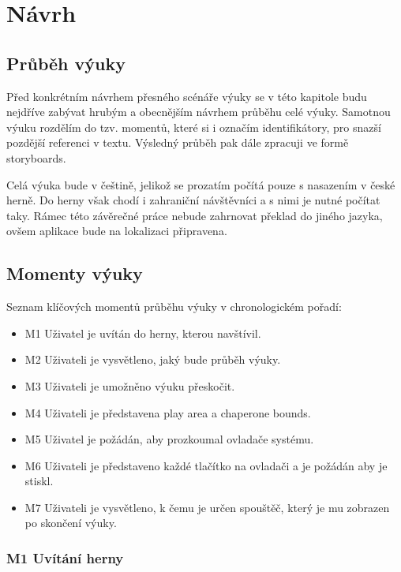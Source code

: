 \section{Návrh}\label{nuxe1vrh}

\subsection{Průběh výuky}\label{prux16fbux11bh-vuxfduky}

Před konkrétním návrhem přesného scénáře výuky se v této kapitole budu
nejdříve zabývat hrubým a obecnějším návrhem průběhu celé výuky.
Samotnou výuku rozdělím do tzv. momentů, které si i označím
identifikátory, pro snazší pozdější referenci v textu. Výsledný průběh
pak dále zpracuji ve formě storyboards.

Celá výuka bude v češtině, jelikož se prozatím počítá pouze s nasazením
v české herně. Do herny však chodí i zahraniční návštěvníci a s nimi je
nutné počítat taky. Rámec této závěrečné práce nebude zahrnovat překlad
do jiného jazyka, ovšem aplikace bude na lokalizaci připravena.

\subsection{Momenty výuky}\label{momenty-vuxfduky}

Seznam klíčových momentů průběhu výuky v chronologickém pořadí:

\begin{itemize}
\tightlist
\item
  M1 Uživatel je uvítán do herny, kterou navštívil.
\item
  M2 Uživateli je vysvětleno, jaký bude průběh výuky.
\item
  M3 Uživateli je umožněno výuku přeskočit.
\item
  M4 Uživateli je představena play area a chaperone bounds.
\item
  M5 Uživatel je požádán, aby prozkoumal ovladače systému.
\item
  M6 Uživateli je představeno každé tlačítko na ovladači a je požádán
  aby je stiskl.
\item
  M7 Uživateli je vysvětleno, k čemu je určen spouštěč, který je mu
  zobrazen po skončení výuky.
\end{itemize}

\subsubsection{M1 Uvítání herny}\label{m1-uvuxedtuxe1nuxed-herny}

